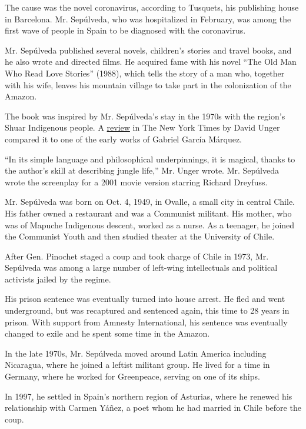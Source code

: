 The cause was the novel coronavirus, according to Tusquets, his
publishing house in Barcelona. Mr. Sepúlveda, who was hospitalized in
February, was among the first wave of people in Spain to be diagnosed
with the coronavirus.

Mr. Sepúlveda published several novels, children's stories and travel
books, and he also wrote and directed films. He acquired fame with his
novel ``The Old Man Who Read Love Stories'' (1988), which tells the
story of a man who, together with his wife, leaves his mountain village
to take part in the colonization of the Amazon.

The book was inspired by Mr. Sepúlveda's stay in the 1970s with the
region's Shuar Indigenous people. A
\href{https://www.nytimes.com/1994/05/01/books/flight-to-amazonia.html?searchResultPosition=5}{review}
in The New York Times by David Unger compared it to one of the early
works of Gabriel García Márquez.

``In its simple language and philosophical underpinnings, it is magical,
thanks to the author's skill at describing jungle life,'' Mr. Unger
wrote. Mr. Sepúlveda wrote the screenplay for a 2001 movie version
starring Richard Dreyfuss.

Mr. Sepúlveda was born on Oct. 4, 1949, in Ovalle, a small city in
central Chile. His father owned a restaurant and was a Communist
militant. His mother, who was of Mapuche Indigenous descent, worked as a
nurse. As a teenager, he joined the Communist Youth and then studied
theater at the University of Chile.

After Gen. Pinochet staged a coup and took charge of Chile in 1973, Mr.
Sepúlveda was among a large number of left-wing intellectuals and
political activists jailed by the regime.

His prison sentence was eventually turned into house arrest. He fled and
went underground, but was recaptured and sentenced again, this time to
28 years in prison. With support from Amnesty International, his
sentence was eventually changed to exile and he spent some time in the
Amazon.

In the late 1970s, Mr. Sepúlveda moved around Latin America including
Nicaragua, where he joined a leftist militant group. He lived for a time
in Germany, where he worked for Greenpeace, serving on one of its ships.

In 1997, he settled in Spain's northern region of Asturias, where he
renewed his relationship with Carmen Yáñez, a poet whom he had married
in Chile before the coup.

